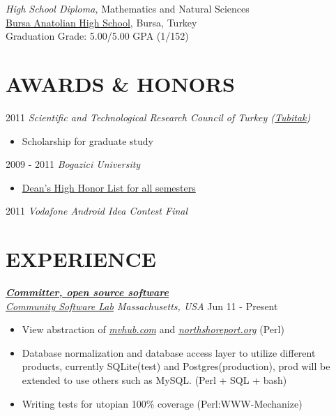 \documentclass[line, margin]{res}
\begin{document}
\begin{resume}
	{\sl High School Diploma,} Mathematics and Natural Sciences \\
	\href{http://www.bursaanadolulisesi.k12.tr/}{Bursa Anatolian High School}, Bursa, Turkey \\
	Graduation Grade: 5.00/5.00 GPA (1/152)               

\section{AWARDS \& HONORS}
	2011 {\sl Scientific and Technological Research Council of Turkey 						(\href{http://www.tubitak.gov.tr/en/ot/10/}{Tubitak})} \\
	\vspace{-.3cm}				
	\begin{itemize} 
		\item Scholarship for graduate study
	\end{itemize}
				
	2009 - 2011 {\sl Bogazici University }
	\begin{itemize} \itemsep -2pt
		\item \href{http://www.eng.boun.edu.tr/current_students.html}{Dean's High Honor List for all semesters}	
	\end{itemize}

	2011 {\sl Vodafone Android Idea Contest Final} \\
 
\section{EXPERIENCE}
	{\sl \textbf{\href{https://launchpad.net/mvhub}{Committer, open source software}} \\ \href{http://thecsl.org/}{Community Software Lab} Massachusetts, USA} \hfill Jun 11 - Present \\
	\vspace{-0.3cm}
	\begin{itemize} \itemsep -2pt
		\item View abstraction of \textit{\href{http://mvhub.com/}{mvhub.com}} and \textit{\href{http://northshoreport.org/}{northshoreport.org}} (Perl)
		\item Database normalization and database access layer to utilize different products, currently SQLite(test) and Postgres(production), prod will be extended to use others such as MySQL. (Perl + SQL + bash)
		\item Writing tests for utopian 100\% coverage (Perl:WWW-Mechanize)
	\end{itemize}


\end{resume}
\end{document}

